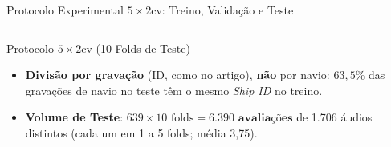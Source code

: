 \documentclass[aspectratio=169]{beamer}
\begin{document}
\begin{frame}{Protocolo Experimental $5\times2\text{cv}$: Treino, Valida\c{c}\~{a}o e Teste}
\begin{columns}[t]
        \vspace{0.03cm}
        \begin{block}{\small Protocolo $5\times2\text{cv}$ (10 Folds de Teste)}
            \scriptsize
            \begin{itemize}
                \item \textbf{Divis\~{a}o por grava\c{c}\~{a}o} (ID, como no artigo), \textbf{n\~{a}o} por navio: $63,5\%$ das grava\c{c}\~{o}es de navio no teste t\^{e}m o mesmo \textit{Ship ID} no treino.
                \item \textbf{Volume de Teste}: $639 \times 10\text{ folds} = \mathbf{6.390\text{ avalia\c{c}\~{o}es}}$ de 1.706 \'{a}udios distintos (cada um em 1 a 5 folds; m\'{e}dia 3,75).
            \end{itemize}
        \end{block}
    \end{columns}
\end{frame}
\end{document}
